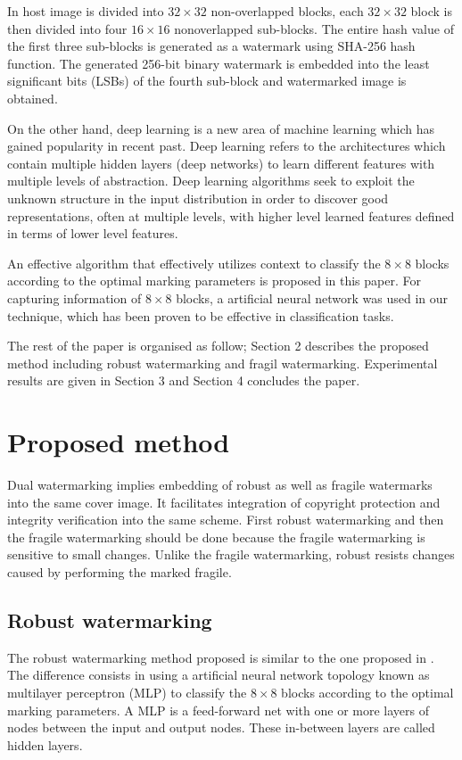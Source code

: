 \documentclass[runningheads]{llncs}
\begin{document}
In \cite{gul2019novel} host image is divided into $32\times 32$ non-overlapped blocks, each $32\times 32$ block is then divided into four $16\times 16$ nonoverlapped sub-blocks. The entire hash value of the first three sub-blocks is generated as a watermark using SHA-256 hash function. The generated 256-bit binary watermark is embedded into the least significant bits (LSBs) of the fourth sub-block and watermarked image is obtained.

On the other hand, deep learning is a new area of machine learning which has gained popularity in recent past. Deep learning refers to the architectures which contain multiple hidden layers (deep networks) to learn different features with multiple levels of abstraction. Deep learning algorithms seek to exploit the unknown structure in the input distribution in order to discover good representations, often at multiple levels, with higher level learned features defined in terms of lower level features. \cite{wani2019advances}

An effective algorithm that effectively utilizes context to classify the $8\times 8$ blocks according to the optimal marking parameters is proposed in this paper. For capturing information of $8\times 8$ blocks, a artificial neural network was used in our technique, which has been proven to be effective in classification tasks.

The rest of the paper is organised as follow; Section 2 describes the proposed method including robust watermarking and fragil watermarking. Experimental results are given in Section 3 and Section 4 concludes the paper.

\section{Proposed method}
Dual watermarking implies embedding of robust as well as fragile watermarks into the same cover image. It facilitates integration of copyright protection and integrity verification into the same scheme. First robust watermarking and then the fragile watermarking should be done because the fragile watermarking is sensitive to small changes. Unlike the fragile watermarking, robust resists changes caused by performing the marked fragile.

\subsection{Robust watermarking}
The robust watermarking method proposed is similar to the one proposed in \cite{avila2018watermarking}. The difference consists in using a artificial neural network topology known as multilayer perceptron (MLP) to classify the $8\times 8$ blocks according to the optimal marking parameters. A MLP is a feed-forward net with one or more layers of nodes between the input and output nodes. These in-between layers are called hidden layers.
\end{document}

